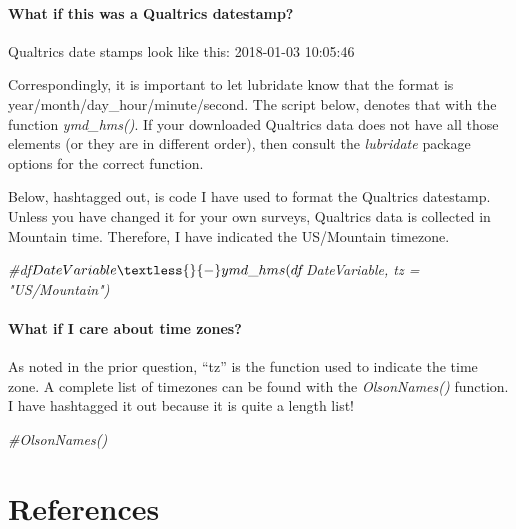 \documentclass[
  11pt,
]{book}
\newenvironment{Shaded}{\begin{snugshade}}{\end{snugshade}}
\newcommand{\CommentTok}[1]{\textcolor[rgb]{0.56,0.35,0.01}{\textit{#1}}}
\begin{document}
\hypertarget{what-if-this-was-a-qualtrics-datestamp}{%
\subsubsection{What if this was a Qualtrics datestamp?}\label{what-if-this-was-a-qualtrics-datestamp}}

Qualtrics date stamps look like this: 2018-01-03 10:05:46

Correspondingly, it is important to let lubridate know that the format is year/month/day\_hour/minute/second. The script below, denotes that with the function \emph{ymd\_hms()}. If your downloaded Qualtrics data does not have all those elements (or they are in different order), then consult the \emph{lubridate} package options for the correct function.

Below, hashtagged out, is code I have used to format the Qualtrics datestamp. Unless you have changed it for your own surveys, Qualtrics data is collected in Mountain time. Therefore, I have indicated the US/Mountain timezone.

\begin{Shaded}
\begin{Highlighting}[]
\CommentTok{\#df$DateVariable \textless{}{-} ymd\_hms(df$DateVariable, tz = "US/Mountain")}
\end{Highlighting}
\end{Shaded}

\hypertarget{what-if-i-care-about-time-zones}{%
\subsubsection{What if I care about time zones?}\label{what-if-i-care-about-time-zones}}

As noted in the prior question, ``tz'' is the function used to indicate the time zone. A complete list of timezones can be found with the \emph{OlsonNames()} function. I have hashtagged it out because it is quite a length list!

\begin{Shaded}
\begin{Highlighting}[]
\CommentTok{\#OlsonNames()}
\end{Highlighting}
\end{Shaded}

\hypertarget{refs}{%
\chapter*{References}\label{refs}}

  
\end{document}
